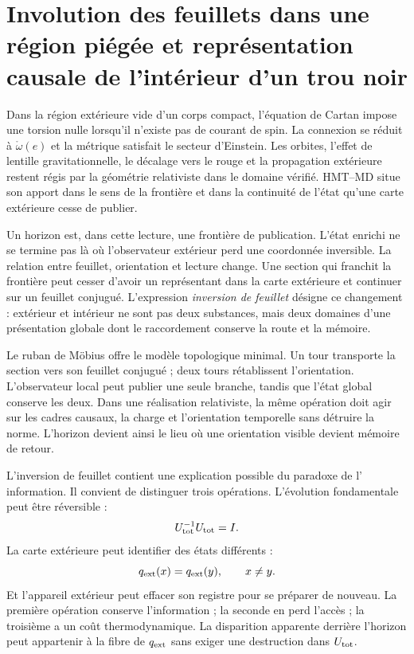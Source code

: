 \section{Involution des feuillets dans une région piégée et représentation causale de l'intérieur d'un trou noir}

Dans la région extérieure vide d'un corps compact, l'équation de Cartan impose
une torsion nulle lorsqu'il n'existe pas de courant de spin. La connexion se réduit à
\(\mathring\omega(e)\) et la métrique satisfait le secteur d'Einstein. Les orbites,
l'effet de lentille gravitationnelle, le décalage vers le rouge et la propagation extérieure restent
régis par la géométrie relativiste dans le domaine vérifié. HMT--MD situe son
apport dans le sens de la frontière et dans la continuité de l'état qu'une
carte extérieure cesse de publier.

Un horizon est, dans cette lecture, une frontière de publication. L'état
enrichi ne se termine pas là où l'observateur extérieur perd une coordonnée
inversible. La relation entre feuillet, orientation et lecture change. Une section qui
franchit la frontière peut cesser d'avoir un représentant dans la carte extérieure et
continuer sur un feuillet conjugué. L'expression \emph{inversion de feuillet} désigne ce
changement : extérieur et intérieur ne sont pas deux substances, mais deux domaines d'une
présentation globale dont le raccordement conserve la route et la mémoire.

Le ruban de Möbius offre le modèle topologique minimal. Un tour transporte la
section vers son feuillet conjugué ; deux tours rétablissent l'orientation. L'observateur
local peut publier une seule branche, tandis que l'état global conserve les deux. Dans
une réalisation relativiste, la même opération doit agir sur les cadres
causaux, la charge et l'orientation temporelle sans détruire la norme. L'horizon
devient ainsi le lieu où une orientation visible devient mémoire de
retour.

L'inversion de feuillet contient une explication possible du paradoxe de l'
information. Il convient de distinguer trois opérations. L'évolution fondamentale peut
être réversible :
\[
 U_{\rm tot}^{-1}U_{\rm tot}=I.
\]
La carte extérieure peut identifier des états différents :
\[
 q_{\rm ext}(x)=q_{\rm ext}(y),
 \qquad x\neq y.
\]
Et l'appareil extérieur peut effacer son registre pour se préparer de nouveau. La première
opération conserve l'information ; la seconde en perd l'accès ; la troisième a
un coût thermodynamique. La disparition apparente derrière l'horizon peut appartenir
à la fibre de \(q_{\rm ext}\) sans exiger une destruction dans \(U_{\rm tot}\).

